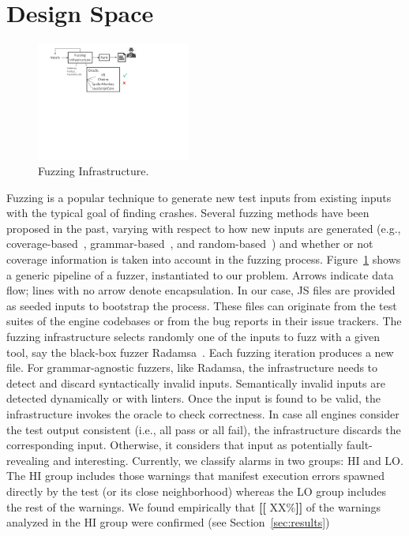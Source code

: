 \documentclass[11pt]{article}
\newcommand{\ie}{i.e.}
\newcommand{\eg}{e.g.}
\newcommand{\Fix}[1]{\textbf{[[}{\color{red} #1}\textbf{]]}}
\begin{document}
\section{Design Space}
\label{sec:design}

\begin{figure}
  \vspace{-5ex}
  \centering
  \includegraphics[trim=20 350 200 0,clip,width=0.45\textwidth]{google-awards-workflow}
  \caption{\label{fig:workflow}Fuzzing Infrastructure.}
  \vspace{-5ex}  
\end{figure}
Fuzzing is a popular technique to generate new test inputs from
existing inputs~\cite{fuzz-testing-history} with the typical goal of
finding crashes. Several fuzzing methods have been proposed in the
past, varying with respect to how new inputs are generated (\eg{},
coverage-based~\cite{afl,honggfuzz},
grammar-based~\cite{grammarinator,jsfunfuzz}, and
random-based~\cite{radamsa}) and whether or not coverage information
is taken into account in the fuzzing
process. Figure~\ref{fig:workflow} shows a generic pipeline of a
fuzzer, instantiated to our problem. Arrows indicate data flow; lines
with no arrow denote encapsulation. In our case, JS files are
provided as seeded inputs to bootstrap the process. These files can
originate from the test suites of the engine codebases or from the bug
reports in their issue trackers. The fuzzing infrastructure selects
randomly one of the inputs to fuzz with a given tool, say the
black-box fuzzer Radamsa~\cite{radamsa}. Each fuzzing iteration
produces a new file. For grammar-agnostic fuzzers, like Radamsa, the
infrastructure needs to detect and discard syntactically invalid
inputs. Semantically invalid inputs are detected dynamically or with
linters. Once the input is found to be valid, the infrastructure
invokes the oracle to check correctness. In case all engines
consider the test output consistent (\ie{}, all pass or all fail), the
infrastructure discards the corresponding input. Otherwise, it considers that
input as potentially fault-revealing and interesting. Currently, we
classify alarms in two groups: HI and LO. The HI group includes
those warnings that manifest execution errors spawned directly by the
test (or its close neighborhood) whereas the LO group includes the
rest of the warnings. We found empirically that \Fix{XX\%} of the
warnings analyzed in the HI group were confirmed (see
Section~\ref{sec:results})
\end{document}
